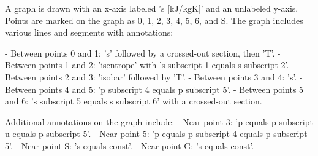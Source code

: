 A graph is drawn with an x-axis labeled 's [kJ/kgK]' and an unlabeled y-axis. Points are marked on the graph as 0, 1, 2, 3, 4, 5, 6, and S. The graph includes various lines and segments with annotations:

- Between points 0 and 1: 's' followed by a crossed-out section, then 'T'.
- Between points 1 and 2: 'isentrope' with 's subscript 1 equals s subscript 2'.
- Between points 2 and 3: 'isobar' followed by 'T'.
- Between points 3 and 4: 's'.
- Between points 4 and 5: 'p subscript 4 equals p subscript 5'.
- Between points 5 and 6: 's subscript 5 equals s subscript 6' with a crossed-out section.

Additional annotations on the graph include:
- Near point 3: 'p equals p subscript u equals p subscript 5'.
- Near point 5: 'p equals p subscript 4 equals p subscript 5'.
- Near point S: 's equals const'.
- Near point G: 's equals const'.